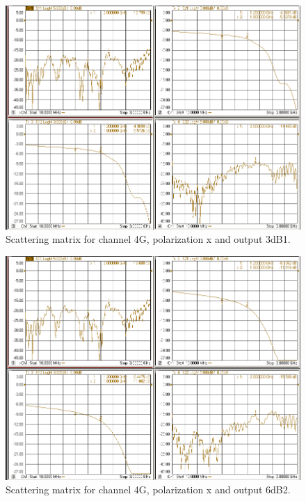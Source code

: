 \documentclass[12pt,a4paper,oneside]{article}
\begin{document}
\begin{figure}[H]
\centering
\includegraphics[width=0.9\linewidth]{VNA_results/4Gx_3dB1.png}
\caption{Scattering matrix for channel 4G, polarization x and output 3dB1.}
\label{fig:4Gx_3dB1}
\end{figure}


\begin{figure}[H]
\centering
\includegraphics[width=0.9\linewidth]{VNA_results/4Gx_6dB2.png}
\caption{Scattering matrix for channel 4G, polarization x and output 6dB2.}
\label{fig:4Gx_6dB2}
\end{figure}
\end{document}
